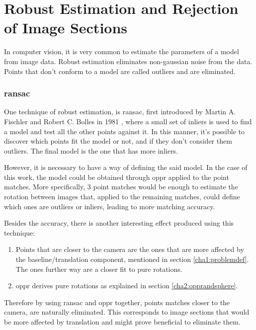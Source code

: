 
\section{Robust Estimation and Rejection of Image Sections}
\label{cha2:robustest}

In computer vision, it is very common to estimate the parameters of a model from image data. Robust estimation eliminates non-gaussian noise from the data. Points that don’t conform to a model are called outliers and are eliminated.

\subsubsection{\acrlong{ransac}}

One technique of robust estimation, is \acrfull{ransac}, first introduced by Martin A. Fischler and Robert C. Bolles in 1981 \cite{ransac}, where a small set of inliers is used to find a model and test all the 
other points against it. In this manner, it's possible to discover which points fit the model or not, and if they don’t consider them outliers. The final model is the one that has more inliers. 

However, it is necessary to have a way of defining the said model. In the case of this work, the model could be obtained through \acrlong{oppr} applied to the point matches. More specifically, 3 point matches would be enough to estimate the rotation between images that, applied to the remaining matches, could define which ones are outliers or inliers, leading to more matching accuracy.

Besides the accuracy, there is another interesting effect produced using this technique:

\begin{enumerate}
\item Points that are closer to the camera are the ones that are more affected by the baseline/translation component, mentioned in section \ref{cha1:problemdef}. The ones further way are a closer fit to pure rotations.

\item \acrshort{oppr} derives pure rotations as explained in section \ref{cha2:opprandsphere}. 
\end{enumerate}
Therefore by using \acrshort{ransac} and \acrshort{oppr} together, points matches closer to the camera, are naturally eliminated. This corresponds to image sections that would be more affected by translation and might prove beneficial to eliminate them. \cite{mono} 

